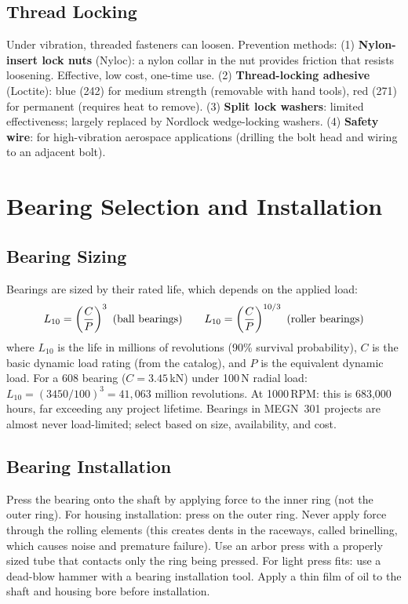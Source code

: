 \subsection{Thread Locking}
Under vibration, threaded fasteners can loosen. Prevention methods: (1) \textbf{Nylon-insert lock nuts} (Nyloc): a nylon collar in the nut provides friction that resists loosening. Effective, low cost, one-time use. (2) \textbf{Thread-locking adhesive} (Loctite): blue (242) for medium strength (removable with hand tools), red (271) for permanent (requires heat to remove). (3) \textbf{Split lock washers}: limited effectiveness; largely replaced by Nordlock wedge-locking washers. (4) \textbf{Safety wire}: for high-vibration aerospace applications (drilling the bolt head and wiring to an adjacent bolt).

\section{Bearing Selection and Installation}
\subsection{Bearing Sizing}
Bearings are sized by their rated life, which depends on the applied load:
\begin{equation}
L_{10} = \left(\frac{C}{P}\right)^3 \text{ (ball bearings\index{ball bearing})} \qquad L_{10} = \left(\frac{C}{P}\right)^{10/3} \text{ (roller bearings\index{roller bearing})}
\end{equation}
where $L_{10}$ is the life in millions of revolutions (90\% survival probability), $C$ is the basic dynamic load rating (from the catalog), and $P$ is the equivalent dynamic load. For a 608 bearing ($C = 3.45$\,kN) under 100\,N radial load: $L_{10} = (3450/100)^3 = 41{,}063$ million revolutions. At 1000\,RPM: this is 683,000 hours, far exceeding any project lifetime. Bearings in MEGN~301 projects are almost never load-limited; select based on size, availability, and cost.

\subsection{Bearing Installation}
Press the bearing onto the shaft by applying force to the inner ring (not the outer ring). For housing installation: press on the outer ring. Never apply force through the rolling elements (this creates dents in the raceways, called brinelling, which causes noise and premature failure). Use an arbor press with a properly sized tube that contacts only the ring being pressed. For light press fits: use a dead-blow hammer with a bearing installation tool. Apply a thin film of oil to the shaft and housing bore before installation.

